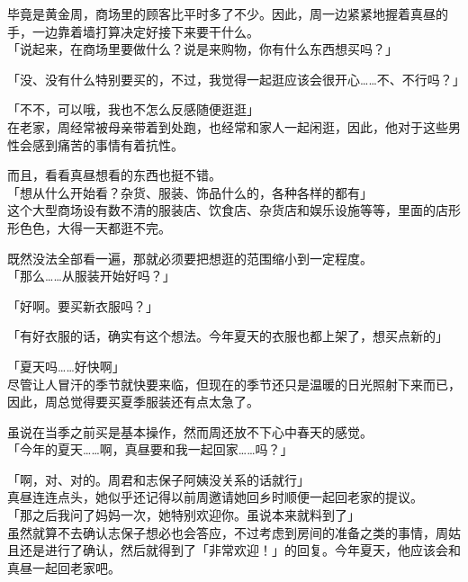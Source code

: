 毕竟是黄金周，商场里的顾客比平时多了不少。因此，周一边紧紧地握着真昼的手，一边靠着墙打算决定好接下来要干什么。\\

「说起来，在商场里要做什么？说是来购物，你有什么东西想买吗？」

「没、没有什么特别要买的，不过，我觉得一起逛应该会很开心……不、不行吗？」

「不不，可以哦，我也不怎么反感随便逛逛」\\

在老家，周经常被母亲带着到处跑，也经常和家人一起闲逛，因此，他对于这些男性会感到痛苦的事情有着抗性。

而且，看看真昼想看的东西也挺不错。\\

「想从什么开始看？杂货、服装、饰品什么的，各种各样的都有」\\

这个大型商场设有数不清的服装店、饮食店、杂货店和娱乐设施等等，里面的店形形色色，大得一天都逛不完。

既然没法全部看一遍，那就必须要把想逛的范围缩小到一定程度。\\

「那么……从服装开始好吗？」

「好啊。要买新衣服吗？」

「有好衣服的话，确实有这个想法。今年夏天的衣服也都上架了，想买点新的」

「夏天吗……好快啊」\\

尽管让人冒汗的季节就快要来临，但现在的季节还只是温暖的日光照射下来而已，因此，周总觉得要买夏季服装还有点太急了。

虽说在当季之前买是基本操作，然而周还放不下心中春天的感觉。\\

「今年的夏天……啊，真昼要和我一起回家……吗？」

「啊，对、对的。周君和志保子阿姨没关系的话就行」\\

真昼连连点头，她似乎还记得以前周邀请她回乡时顺便一起回老家的提议。\\

「那之后我问了妈妈一次，她特别欢迎你。虽说本来就料到了」\\

虽然就算不去确认志保子想必也会答应，不过考虑到房间的准备之类的事情，周姑且还是进行了确认，然后就得到了「非常欢迎！」的回复。今年夏天，他应该会和真昼一起回老家吧。\\

